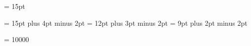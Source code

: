 \newif\ifpassthroughchars
\passthroughcharsfalse

%
\def\DeclareUnicodeCharacterNative#1#2{%
  \ifnum"#1>"7F %
    \catcode"#1=\active
    \def\dodeclareunicodecharacternative##1##2##3{%
      \begingroup
        \uccode`\~="##2\relax
        \uppercase{\gdef~}{%
          \ifpassthroughchars
            ##1%
          \else
            ##3%
          \fi
        }
      \endgroup
    }
    \begingroup
      \uccode`\.="#1\relax
      \uppercase{\def\UTFNativeTmp{.}}%
      \expandafter\dodeclareunicodecharacternative\UTFNativeTmp{#1}{#2}%
    \endgroup
  \fi
}

\def\nativeunicodechardefs{%
  \let\DeclareUnicodeCharacter\DeclareUnicodeCharacterNative
  \unicodechardefs
}

\def\DeclareUnicodeCharacterNativeAtU#1#2{%
  \def\UTFAtUTmp{#2}
  \expandafter\globallet\csname uni:#1\endcsname \UTFAtUTmp
}

\def\nativeunicodechardefsatu{%
  \let\DeclareUnicodeCharacter\DeclareUnicodeCharacterNativeAtU
  \unicodechardefs
}

\def\asciichardefs{%
   \relax
}

\iftxinativeunicodecapable
  \nativeunicodechardefsatu
\else
  \utfeightchardefs
\fi



\newdimen{} {} = 15pt

\chapheadingskip = 15pt plus 4pt minus 2pt
\secheadingskip = 12pt plus 3pt minus 2pt
\subsecheadingskip = 9pt plus 2pt minus 2pt

\vbadness = 10000

